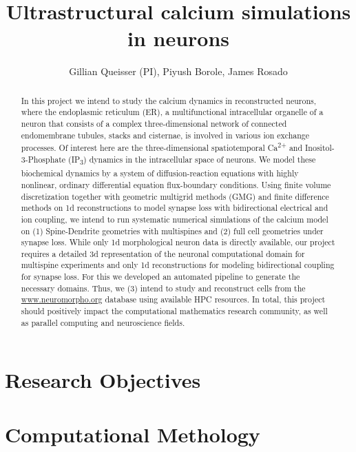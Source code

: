 \documentclass[a4paper, 10pt, notitlepage]{nsf}
\author{Gillian Queisser (PI), Piyush Borole, James Rosado}
\title{Ultrastructural calcium simulations in neurons}
\date{}
\begin{document}

\maketitle
\begin{abstract}
In this project we intend to study the calcium dynamics in reconstructed neurons, where the endoplasmic reticulum (ER), a multifunctional intracellular organelle of a neuron that consists of a complex three-dimensional network of connected endomembrane tubules, stacks and cisternae, is involved in various ion exchange processes. Of interest here are the three-dimensional spatiotemporal Ca\textsuperscript{2+} and Inositol-3-Phosphate (IP\textsubscript{3}) dynamics in the intracellular space of neurons. We model these biochemical dynamics by a system of diffusion-reaction equations with highly nonlinear, ordinary differential equation flux-boundary conditions. Using finite volume discretization together with geometric multigrid methods (GMG) {\color{red} and finite difference methods on 1d reconstructions to model synapse loss with bidirectional electrical and ion coupling}, we intend to run systematic numerical simulations of the calcium model on (1) Spine-Dendrite geometries with {\color{red} multispines} and (2) full cell geometries {\color{red} under synapse loss}. While only 1d morphological neuron data is directly available, our project requires a detailed 3d representation of the neuronal computational domain {\color{red} for multispine experiments} {\color{red} and only 1d reconstructions for modeling bidirectional coupling for synapse loss}. For this we developed an automated pipeline to generate the necessary domains. Thus, we (3) intend to study and reconstruct cells from the \url{www.neuromorpho.org} database using available HPC resources. In total, this project should positively impact the computational mathematics research community, as well as parallel computing and neuroscience fields.
\end{abstract}


\section{Research Objectives}

%

\section{Computational Methology}

\end{document}
